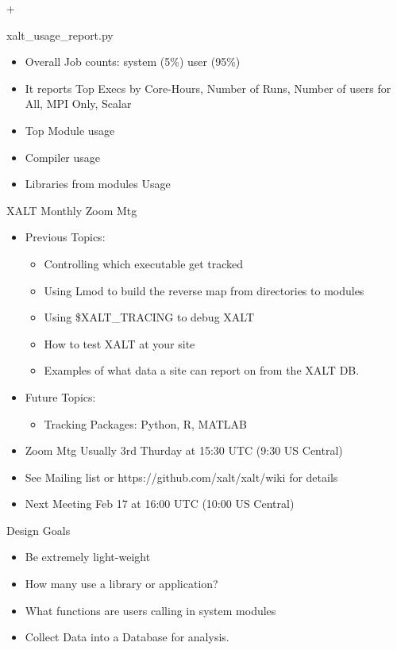 +\documentclass{beamer}
\begin{document}
\begin{frame}{xalt\_usage\_report.py}
  \begin{itemize}
    \item Overall Job counts: system (5\%) user (95\%)
    \item It reports Top Execs by Core-Hours, Number of Runs,
      Number of users for All, MPI Only, Scalar
    \item Top Module usage
    \item Compiler usage
    \item Libraries from modules Usage
  \end{itemize}
\end{frame}

\begin{frame}{XALT Monthly Zoom Mtg}
  \begin{itemize}
    \item Previous Topics:
      \begin{itemize}
        \item Controlling which executable get tracked
        \item Using Lmod to build the reverse map from directories to modules
        \item Using \$XALT\_TRACING to debug XALT
        \item How to test XALT at your site
        \item Examples of what data a site can report on from the XALT DB.
      \end{itemize}
    \item Future Topics:
      \begin{itemize}
        \item Tracking Packages: Python, R, MATLAB
      \end{itemize}
    \item Zoom Mtg Usually 3rd Thurday at 15:30 UTC (9:30 US Central)
    \item See Mailing list or https://github.com/xalt/xalt/wiki for
      details
    \item Next Meeting Feb 17 at 16:00 UTC (10:00 US Central)
  \end{itemize}
\end{frame}

\begin{frame}{Design Goals}
  \begin{itemize}
    \item Be extremely light-weight
    \item How many use a library or application?
    \item What functions are users calling in system modules
    \item Collect Data into a Database for analysis.
  \end{itemize}
\end{frame}
\end{document}
